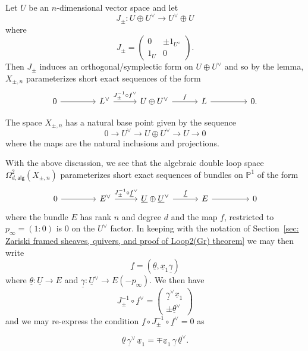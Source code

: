 \message{ !name(Bryan-Vakil.tex)}\documentclass{amsart}
\theoremstyle{definition}
\newcommand{\PP}{\mathbb{P}}
\newcommand{\UL}[1]{\underline{#1}}
\newcommand{\alg}{\mathsf{alg}}
\newcommand{\LoopTwo}{\Omega^{2}_{d,\alg}}
\newcommand{\Xpm}{X_{\pm,n}}
\begin{document}
Let $U$ be an $n$-dimensional vector space and let 
\[
J_{\pm}: U\oplus U^{\vee} \to U^{\vee}\oplus U
\]
where 
\[
J_{\pm} = \begin{pmatrix}
        0 & \pm 1_{U^{\vee }}\\
        1_{U} & 0
      \end{pmatrix}.
\]
Then $J_{\pm}$ induces an orthogonal/symplectic form on $U\oplus
U^{\vee}$ and so by the lemma, $\Xpm$ parameterizes short exact
sequences of the form
\[
\begin{tikzcd}[column sep={6em,between origins}]
0 \arrow[r] &
L^{\vee } \arrow[r, "J_{\pm }^{-1}\circ f^{\vee}"] &
U\oplus U^{\vee } \arrow[r, "f"] &
L \arrow[r] &
0.
\end{tikzcd}
\]

The space $\Xpm$ has a natural base point given by the sequence
\[
0\to U^{\vee}\to U\oplus U^{\vee} \to U\to 0
\]
where the maps are the natural inclusions and projections.

With the above discussion, we see that the algebraic double loop space
$\LoopTwo(\Xpm )$ parameterizes short exact sequences of
bundles on $\PP^{1}$ of the form
\begin{equation}\label{eqn: Evee-->U+Uvee-->E}
\begin{tikzcd}[column sep={6em,between origins}]
0 \arrow[r] &
E^{\vee } \arrow[r, "J_{\pm }^{-1}\circ \UL{f}^{\vee}"] &
\UL{U}\oplus \UL{U}^{\vee } \arrow[r, "\UL{f}"] &
E \arrow[r] &
0
\end{tikzcd}
\end{equation}
where the bundle $E$ has rank $n$ and degree $d$ and the map $\UL{f}$,
restricted to $p_{\infty} = (1:0)$ is 0 on the $U^{\vee}$ factor. In
keeping with the notation of Section~\ref{sec: Zariski framed sheaves,
quivers, and proof of Loop2(Gr) theorem} we may then write
\[
\UL{f} = (\UL{\theta},\UL{x}_{1}\UL{\gamma})
\]
where $\UL{\theta}:\UL{U}\to E$ and $\UL{\gamma}:\UL{U}^{\vee}\to
E(-p_{\infty}).$ We then have
\[
J_{\pm}^{-1}\circ \UL{f}^{\vee} = \begin{pmatrix} \UL{\gamma}^{\vee}\UL{x}_{1} \\
\pm \UL{\theta}^{\vee}  \end{pmatrix}
\]
and we may re-express the condition $\UL{f}\circ J_{\pm}^{-1}\circ
\UL{f}^{\vee}=0$ as

\begin{equation}\label{eqn: theta gammadual x1 = mp x1 gamma thetadual}
\UL{\theta}\, \UL{\gamma}^{\vee}\, \UL{x}_{1} =  \mp \UL{x}_{1}\, 
\UL{\gamma}\,  \UL{\theta}^{\vee }.
\end{equation}
\end{document}
